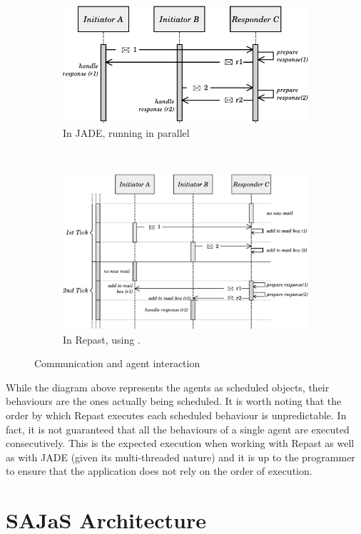 \begin{figure}
	\centering
    \begin{subfigure}[b]{\linewidth}
		\centering
		\includegraphics[width=0.6\linewidth]{figures/tickExample2.pdf}
		\caption{
			In JADE, running in parallel
		}
		\label{fig:com-example-jade}
    \end{subfigure} \\
    \begin{subfigure}[b]{\linewidth}
		\centering
		\includegraphics[width=0.8\linewidth]{figures/tickExample.pdf}
		\caption{
			In Repast, using \apiname{}.
		}
		\label{fig:com-example-repast}
    \end{subfigure}
    \caption{Communication and agent interaction}
    \label{fig:execution_example}
\end{figure}


While the diagram above represents the agents as scheduled objects, their behaviours are the ones actually being scheduled. It is worth noting that the order by which Repast executes each scheduled behaviour is unpredictable. In fact, it is not guaranteed that all the behaviours of a single agent are executed consecutively. This is the expected execution when working with Repast as well as with JADE (given its multi-threaded nature) and it is up to the programmer to ensure that the application does not rely on the order of execution.

\section{SAJaS Architecture}

